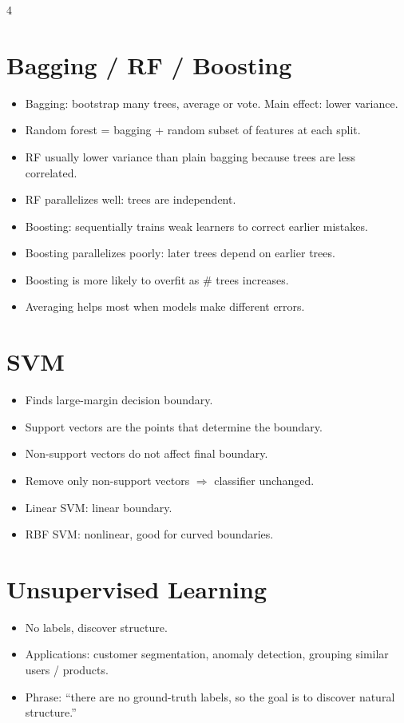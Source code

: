\documentclass[11pt,landscape]{article}
\begin{document}
\begin{multicols}{4}
		\section{Bagging / RF / Boosting}
		\begin{itemize}
			\item Bagging: bootstrap many trees, average or vote. Main effect: lower variance.
			\item Random forest = bagging + random subset of features at each split.
			\item RF usually lower variance than plain bagging because trees are less correlated.
			\item RF parallelizes well: trees are independent.
			\item Boosting: sequentially trains weak learners to correct earlier mistakes.
			\item Boosting parallelizes poorly: later trees depend on earlier trees.
			\item Boosting is more likely to overfit as \# trees increases.
			\item Averaging helps most when models make different errors.
		\end{itemize}
		
		\section{SVM}
		\begin{itemize}
			\item Finds large-margin decision boundary.
			\item Support vectors are the points that determine the boundary.
			\item Non-support vectors do not affect final boundary.
			\item Remove only non-support vectors $\Rightarrow$ classifier unchanged.
			\item Linear SVM: linear boundary.
			\item RBF SVM: nonlinear, good for curved boundaries.
		\end{itemize}
		
		\section{Unsupervised Learning}
		\begin{itemize}
			\item No labels, discover structure.
			\item Applications: customer segmentation, anomaly detection, grouping similar users / products.
			\item Phrase: ``there are no ground-truth labels, so the goal is to discover natural structure.''
		\end{itemize}
		

\end{multicols}
\end{document}

